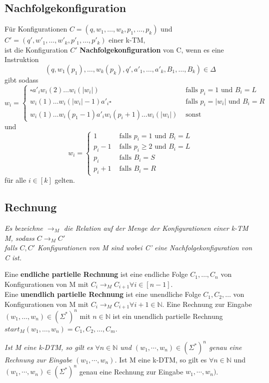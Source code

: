 \subsection{Nachfolgekonfiguration}
    Für Konfigurationen \(C=(q,w_1,\dots,w_k,p_1,\dots,p_k)\) und \(C'=(q',w'_1,\dots,w'_k,p'_1,\dots,p'_k)\) einer k-TM, \\
    ist die Konfiguration \(C'\) \textbf{Nachfolgekonfiguration} von C, wenn es eine Instruktion 
    \[(q,w_1(p_1),\dots,w_k(p_k),q',a'_1,\dots,a'_k,B_1,\dots,B_k)\in\Delta\] 
    gibt sodass
    \[
    w_i = \begin{cases}
        \square a'_iw_i(2)\dots w_i(|w_i|) & \text{ falls } p_i=1 \text{ und } B_i=L\\
        w_i(1)\dots w_i(|w_i|-1)a'_i\square & \text{ falls } p_i=|w_i| \text{ und } B_i = R\\
        w_i(1)\dots w_i(p_1-1)a'_iw_i(p_i+1)\dots w_i(|w_i|) & \text{ sonst}
    \end{cases}    
    \]
    und 
    \[
    w_i = \begin{cases}
        1 & \text{ falls } p_i=1 \text{ und } B_i=L\\
        p_i-1 & \text{ falls } p_i \geq 2 \text{ und } B_i = L\\
        p_i & \text{ falls } B_i=S\\
        p_i+1 & \text{ falls } B_i=R
    \end{cases}    
    \]
    für alle \(i\in [k]\) gelten.
\subsection{Rechnung}
    \textit{Es bezeichne \(\to _M\) die Relation auf der Menge der Konfigurationen einer k-TM M, sodass \(C\to _M C'\) \\
    falls \(C,C'\) Konfigurationen von M sind wobei C' eine Nachfolgekonfiguration von C ist.} \par\bigskip
    Eine \textbf{endliche partielle Rechnung} ist eine endliche Folge \(C_1,\dots,C_n\) von Konfigurationen von 
    M mit \(C_i\to _M C_{i+1}\forall i\in[n-1]\).\\
    Eine \textbf{unendlich partielle Rechnung} ist eine unendliche Folge \(C_1,C_2,\dots\) von Konfigurationen von 
    M mit \(C_i\to _M C_{i+1}\forall i+1\in\mathbb{N}\).
    Eine Rechnung zur Eingabe \((w_1,\dots,w_n)\in(\Sigma^*)^n\) mit \(n\in \mathbb{N}\) ist ein 
    unendlich partielle Rechnung \(start_M(w_1,\dots,w_n)=C_1,C_2,\dots,C_m\).
    \par\bigskip
    \textit{Ist M eine k-DTM, so gilt es \(\forall n \in \mathbb{N}\) und \((w_1, \cdots, w_n) \in (\Sigma^*)^n\) genau eine Rechnung zur Eingabe \((w_1, \cdots, w_n)\).}
    Ist M eine k-DTM, so gilt es \(\forall n \in \mathbb{N}\) und \((w_1, \cdots, w_n) \in (\Sigma^*)^n\) genau eine Rechnung zur Eingabe \(w_1, \cdots, w_n)\).

